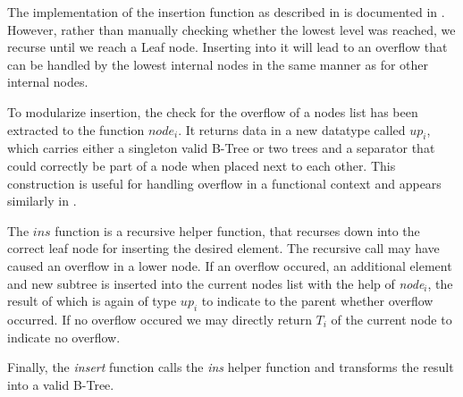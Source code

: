 The implementation of the insertion function
as described in  is documented in .
However, rather than manually checking whether the lowest level was reached,
we recurse until we reach a Leaf node.
Inserting into it will lead to an overflow that can be handled
by the lowest internal nodes in the same manner as for other internal nodes.

To modularize insertion, the check for the overflow of a nodes list has been
extracted to the function $node_i$.
It returns data in a new datatype called $up_i$, which
carries either a singleton valid B-Tree or two trees and a separator
that could correctly be part of a node when placed next to each other.
This construction is useful for handling overflow
in a functional context and appears similarly in \parencite{DBLP:conf/itp/Nipkow16}.

The $ins$ function is a recursive helper function,
that recurses down into the correct leaf node for inserting the desired element.
The recursive call may have caused an overflow in a lower node.
If an overflow occured, an additional element and
new subtree is inserted into the
current nodes list with the help of \textit{node}$_i$,
the result of which is again of type $up_i$ to indicate to
the parent whether overflow occurred.
If no overflow occured we may directly return $T_i$ of the current node
to indicate no overflow.

Finally, the \textit{insert} function calls the \textit{ins} helper function
and transforms the result into a valid B-Tree.

